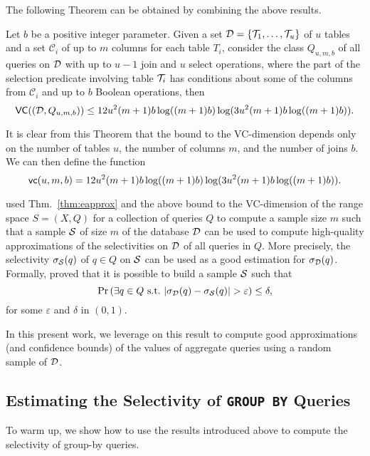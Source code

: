 The following Theorem can be obtained by combining the above results.

\begin{theorem}\label{thm:vcdimgenqueries}
Let $b$ be a positive integer parameter. Given a set
${\cal D}=\{{\cal T}_1,\dotsc,{\cal T}_u\}$ of $u$ tables and a set $\mathcal{C}_i$ of
up to $m$ columns for each table $T_i$, consider the class $Q_{u,m,b}$ of all
queries on ${\cal D}$ with up to $u-1$ join and $u$ select operations, where the
part of the selection predicate involving table ${\cal T}_i$ has conditions about
some of the columns from $\mathcal{C}_i$ and up to $b$ Boolean operations, then 
\[
\mathsf{VC}(({\cal D},Q_{u,m,b})) \leq 
12u^2(m+1)b\log((m+1)b)\log(3u^2(m+1)b\log((m+1)b)).\]
\end{theorem}
It is clear from this Theorem that the bound to the VC-dimension depends
only on the number of tables $u$, the number of columns $m$, and the number of
joins $b$. We can then define the function
\[
\mathsf{vc}(u,m,b)=12u^2(m+1)b\log((m+1)b)\log(3u^2(m+1)b\log((m+1)b)).\]

\citet{RiondatoACZU11} used Thm.~\ref{thm:eapprox} and the above bound to the
VC-dimension of the range space $S=(X,Q)$ for a collection of queries $Q$ to
compute a sample size $m$ such that a sample ${\cal S}$ of size $m$ of the database
${\cal D}$ can be used to compute high-quality approximations of the selectivities on
${\cal D}$ of all queries in $Q$. More precisely, the selectivity
$\sigma_{\cal S}(q)$ of $q\in Q$ on ${\cal S}$ can be used as a good estimation
for $\sigma_{\cal D}(q)$. Formally, \citet{RiondatoACZU11} proved that it is
possible to build a sample ${\cal S}$ such that
\[
\Pr\left(\exists q\in Q \text{ s.t.~}
|\selectivity_\Db(q)-\selectivity_\Sam(q)|>\varepsilon\right)\le\delta,
\]
for some $\varepsilon$ and $\delta$ in $(0,1)$.


In this present work, we leverage on this result to compute good approximations
(and confidence bounds) of the values of aggregate queries using a random sample
of ${\cal D}$.

\subsection{Estimating the Selectivity of \texttt{GROUP BY} Queries}\label{sec:groupby}
To warm up, we show how to use the results introduced above to compute the
selectivity of group-by queries.

